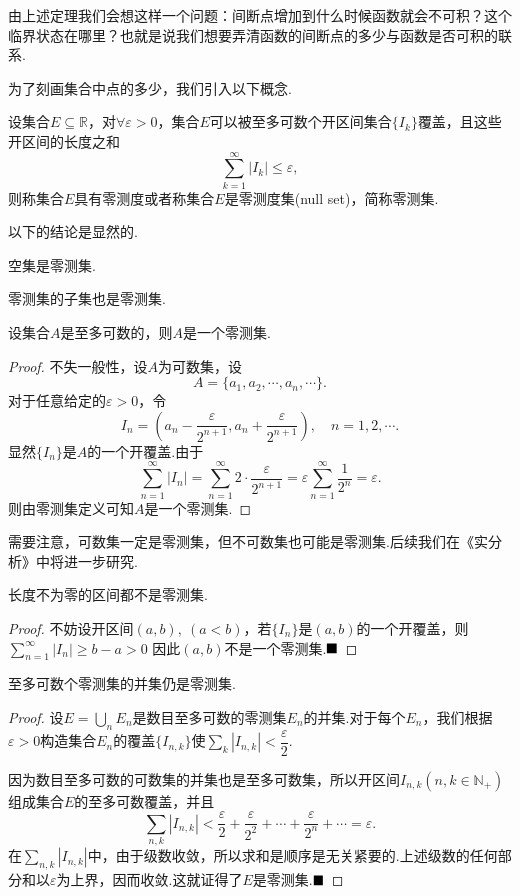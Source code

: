 由上述定理我们会想这样一个问题：间断点增加到什么时候函数就会不可积？这个临界状态在哪里？也就是说我们想要弄清函数的间断点的多少与函数是否可积的联系.

为了刻画集合中点的多少，我们引入以下概念.
\begin{definition}[零测度集]
	设集合$E\subseteq\mathbb{R}$，对$\forall\varepsilon>0$，集合$E$可以被至多可数个开区间集合$\{I_k\}$覆盖，且这些开区间的长度之和
	$$\sum_{k=1}^{\infty}|I_k|\leqslant\varepsilon,$$
	则称集合$E$具有{\heiti 零测度}或者称集合$E$是{\heiti 零测度集}(null set)，简称{\heiti 零测集}.
\end{definition}
以下的结论是显然的.
\begin{proposition}
	空集是零测集.
\end{proposition}
\begin{proposition}
	零测集的子集也是零测集.
\end{proposition}
\begin{proposition}
	设集合$A$是至多可数的，则$A$是一个零测集.
\end{proposition}
\begin{proof}
	不失一般性，设$A$为可数集，设
	$$A=\{a_1,a_2,\cdots,a_n,\cdots\}.$$
	对于任意给定的$\varepsilon>0$，令
	$$I_n=(a_n-\frac{\varepsilon}{2^{n+1}},a_n+\frac{\varepsilon}{2^{n+1}}),\quad n=1,2,\cdots.$$
	显然$\{I_n\}$是$A$的一个开覆盖.由于
	$$\sum_{n=1}^{\infty}|I_n|=\sum_{n=1}^{\infty}2\cdot\frac{\varepsilon}{2^{n+1}}=\varepsilon\sum_{n=1}^{\infty}\frac{1}{2^n}=\varepsilon.$$
	则由零测集定义可知$A$是一个零测集.
\end{proof}
\begin{remark}
	需要注意，可数集一定是零测集，但不可数集也可能是零测集.后续我们在《实分析》中将进一步研究.
\end{remark}
\begin{proposition}
	长度不为零的区间都不是零测集.
\end{proposition}
\begin{proof}
	不妨设开区间$(a,b),\ (a<b)$，若$\{I_n\}$是$(a,b)$的一个开覆盖，则
	$\sum_{n=1}^{\infty}|I_n|\geqslant b-a>0$
	因此$(a,b)$不是一个零测集.$\hfill\blacksquare$
\end{proof}
\begin{proposition}
	至多可数个零测集的并集仍是零测集.
\end{proposition}
\begin{proof}
	设$E=\displaystyle\bigcup\limits_{n}E_n$是数目至多可数的零测集$E_n$的并集.对于每个$E_n$，我们根据$\varepsilon>0$构造集合$E_n$的覆盖$\{I_{n,k}\}$使$\displaystyle\sum\limits_{k}|I_{n,k}|<\dfrac{\varepsilon}{2}$.
	
	因为数目至多可数的可数集的并集也是至多可数集，所以开区间$I_{n,k}(n,k\in\mathbb{N}_+)$组成集合$E$的至多可数覆盖，并且
	$$\sum_{n,k}|I_{n,k}|<\frac{\varepsilon}{2}+\frac{\varepsilon}{2^2}+\cdots+\frac{\varepsilon}{2^n}+\cdots=\varepsilon.$$
	在$\sum_{n,k}|I_{n,k}|$中，由于级数收敛，所以求和是顺序是无关紧要的.上述级数的任何部分和以$\varepsilon$为上界，因而收敛.这就证得了$E$是零测集.$\hfill\blacksquare$
\end{proof}

